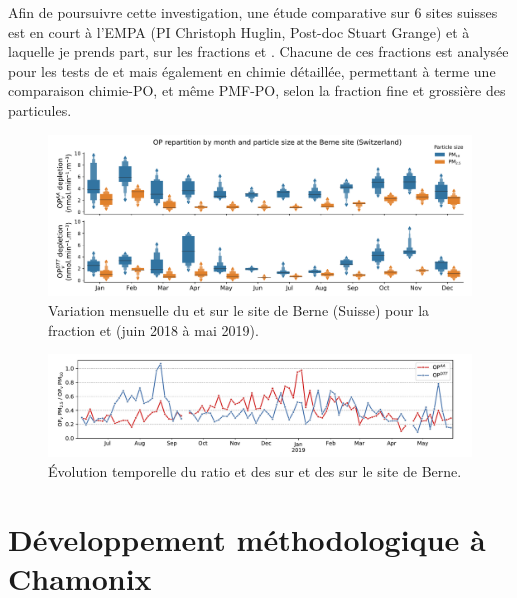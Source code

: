 Afin de poursuivre cette investigation, une étude comparative sur 6 sites suisses est
en court à l'EMPA (PI Christoph Huglin, Post-doc Stuart Grange) et à laquelle je prends part, sur les fractions \PMdix{} et
\PMdc. Chacune de ces fractions est analysée pour les tests de \POAA{} et \PODTT{} mais également en
chimie détaillée, permettant à terme une comparaison chimie-PO, et même PMF-PO, selon la
fraction fine et grossière des particules.

\begin{figure}[ht]
    \centering
    \includegraphics[width=1.0\linewidth]{figures/chapter04/PO_berne.pdf}
    \caption{Variation mensuelle du \POAAv{} et \PODTTv{} sur le site de Berne (Suisse)
    pour la fraction \PMdix{} et \PMdc{} (juin 2018 à mai 2019).}%
    \label{fig:PO_berne}
\end{figure}

\begin{figure}[ht]
    \centering
    \includegraphics[width=1\linewidth]{figures/chapter04/PO_berne_ratio_PM10_PM25.pdf}
    \caption{Évolution temporelle du ratio \POAAv{} et \PODTTv{} des \PMdix{} sur \POAAv{}
    et \PODTTv{} des \PMdc{} sur le site de Berne.}%
    \label{fig:PO_berne_ratio_PM10_PM25}
\end{figure}



\clearpage
\section{Développement méthodologique à Chamonix}%
\label{ssub:développement_méthodologique_à_chamonix}


